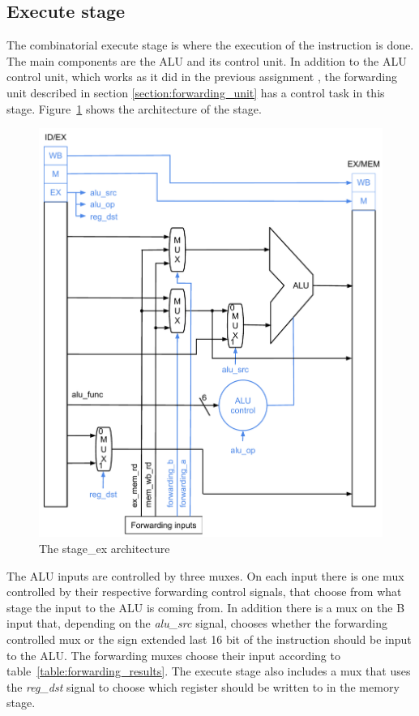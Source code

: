 \subsection{Execute stage}
The combinatorial execute stage is where the execution of the instruction is done. The main components are the ALU and its control unit. In addition to the ALU control unit, which works as it did in the previous assignment \cite{multicycle}, the forwarding unit described in section \ref{section:forwarding_unit} has a control task in this stage. Figure~\ref{fig:stage_ex} shows the architecture of the stage.

\begin{figure}[h]
        \centering\includegraphics[scale=0.5]{figures/stage_ex}
        \caption{The stage\_ex architecture}
        \label{fig:stage_ex}
\end{figure}

The ALU inputs are controlled by three muxes. On each input there is one mux controlled by their respective forwarding control signals, that choose from what stage the input to the ALU is coming from. In addition there is a mux on the B input that, depending on the \emph{alu\_src} signal, chooses whether the forwarding controlled mux or the sign extended last 16 bit of the instruction should be input to the ALU. The forwarding muxes choose their input according to table~\ref{table:forwarding_results}. The execute stage also includes a mux that uses the \emph{reg\_dst} signal to choose which register should be written to in the memory stage.

